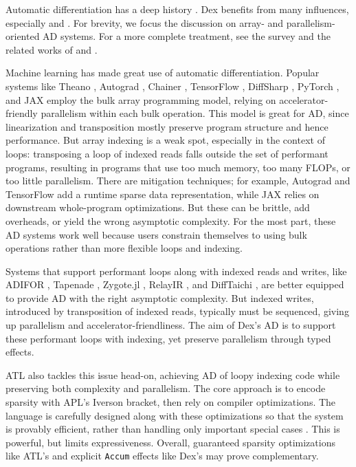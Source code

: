 \documentclass[acmsmall,screen,nonacm]{acmart}
\begin{document}
Automatic differentiation has a deep history \citep{baydin2017adsurvey,griewank2008evaluating,pearlmutter2008lambda}.
Dex benefits from many influences, especially \citet{elliott2018ad} and \citet{jax2018github}.
For brevity, we focus the discussion on array- and parallelism-oriented AD systems.
For a more complete treatment, see the survey \citet{baydin2017adsurvey} and the related works of \citet{shaikhha2019fsmooth} and \citet{bernstein2020differentiating}.

Machine learning has made great use of automatic differentiation.
Popular systems like Theano \citep{bergstra2010theano}, Autograd \citep{maclaurin2015autograd}, Chainer \citep{tokui2019chainer}, TensorFlow \citep{abadi2016tensorflow}, DiffSharp \citep{baydin2017adsurvey}, PyTorch \citep{paszke2019pytorch}, and JAX \citep{jax2018github} employ the bulk array programming model, relying on accelerator-friendly parallelism within each bulk operation.
This model is great for AD, since linearization and transposition mostly preserve program structure and hence performance.
But array indexing is a weak spot, especially in the context of loops: transposing a loop of indexed reads falls outside the set of performant programs, resulting in programs that use too much memory, too many FLOPs, or too little parallelism.
There are mitigation techniques; for example, Autograd and TensorFlow add a runtime sparse data representation, while JAX relies on downstream whole-program optimizations.
But these can be brittle, add overheads, or yield the wrong asymptotic complexity.
For the most part, these AD systems work well because users constrain themselves to using bulk operations rather than more flexible loops and indexing.

Systems that support performant loops along with indexed reads and writes, like ADIFOR \citep{bischof1992adifor}, Tapenade \citep{hascoet2013tapenade}, Zygote.jl \citep{Zygote.jl-2018}, RelayIR \citep{roesch2018relay}, and DiffTaichi \citep{hu2020difftaichi}, are better equipped to provide AD with the right asymptotic complexity.
But indexed writes, introduced by transposition of indexed reads, typically must be sequenced, giving up parallelism and accelerator-friendliness.
The aim of Dex's AD is to support these performant loops with indexing, yet preserve parallelism through typed effects.

ATL \citep{bernstein2020differentiating} also tackles this issue head-on, achieving AD of loopy indexing code while preserving both complexity and parallelism.
The core approach is to encode sparsity with APL's Iverson bracket, then rely on compiler optimizations.
The language is carefully designed along with these optimizations so that the system is provably efficient, rather than handling only important special cases \citep{huckelheim2019automatic,li2018halidead}.
This is powerful, but limits expressiveness.
Overall, guaranteed sparsity optimizations like ATL's and explicit \texttt{Accum} effects like Dex's may prove complementary.
\end{document}
